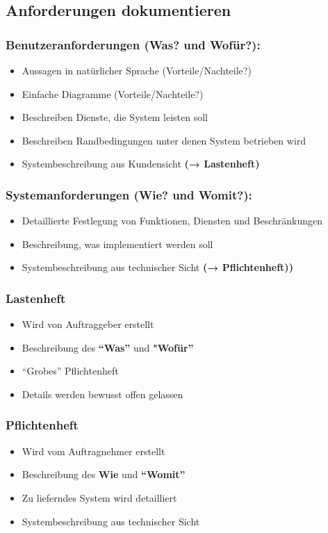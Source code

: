 \documentclass[11pt, a4paper]{article}
\begin{document}
\subsection{Anforderungen dokumentieren}

\subsubsection*{Benutzeranforderungen (Was? und Wofür?):}
\begin{itemize}
    \item Aussagen in natürlicher Sprache (Vorteile/Nachteile?)
    \item Einfache Diagramme (Vorteile/Nachteile?)
    \item Beschreiben Dienste, die System leisten soll
    \item Beschreiben Randbedingungen unter denen System betrieben wird
    \item Systembeschreibung aus Kundensicht \textbf{(→ Lastenheft)}
\end{itemize}

\subsubsection*{Systemanforderungen (Wie? und Womit?):}
\begin{itemize}
    \item Detaillierte Festlegung von Funktionen, Diensten und Beschränkungen
    \item Beschreibung, was implementiert werden soll
    \item Systembeschreibung aus technischer Sicht \textbf{(→ Pflichtenheft))}
\end{itemize}

\subsubsection{Lastenheft}
\begin{itemize}
    \item Wird von Auftraggeber erstellt
    \item Beschreibung des \textbf{“Was”} und \textbf{"Wofür”}
    \item “Grobes” Pflichtenheft
    \item Details werden bewusst offen gelassen
\end{itemize}

\subsubsection{Pflichtenheft}
\begin{itemize}
    \item Wird vom Auftragnehmer erstellt
    \item Beschreibung des \textbf{Wie} und \textbf{“Womit”}
    \item Zu lieferndes System wird detailliert
    \item Systembeschreibung aus technischer Sicht
\end{itemize}
\end{document}
